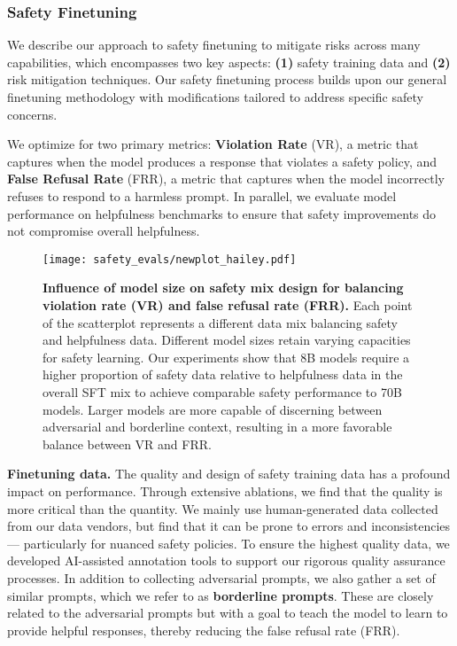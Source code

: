 \subsubsection{Safety Finetuning}

We describe our approach to safety finetuning to mitigate risks across many capabilities, which encompasses two key aspects: \textbf{(1)} safety training data and \textbf{(2)} risk mitigation techniques. Our safety finetuning process builds upon our general finetuning methodology with modifications tailored to address specific safety concerns.

We optimize for two primary metrics: \textbf{Violation Rate} (VR), a metric that captures when the model produces a response that violates a safety policy, and \textbf{False Refusal Rate} (FRR), a metric that captures when the model incorrectly refuses to respond to a harmless prompt.  In parallel, we evaluate model performance on helpfulness benchmarks to ensure that safety improvements do not compromise overall helpfulness.

\begin{wrapfigure}{r}{0.5\textwidth}
    \centering
    \texttt{[image: safety\_evals/newplot\_hailey.pdf]}
    \caption{\textbf{Influence of model size on safety mix design for balancing violation rate (VR) and false refusal rate (FRR).} Each point of the scatterplot represents a different data mix balancing safety and helpfulness data. Different model sizes retain varying capacities for safety learning. Our experiments show that 8B models require a higher proportion of safety data relative to helpfulness data in the overall SFT mix to achieve comparable safety performance to 70B models. Larger models are more capable of discerning between adversarial and borderline context, resulting in a more favorable balance between VR and FRR.}
    \label{fig:vr_frr_model_size_experiment}
\end{wrapfigure}

\textbf{Finetuning data.}
The quality and design of safety training data has a profound impact on performance. Through extensive ablations, we find that the quality is more critical than the quantity. We mainly use human-generated data collected from our data vendors, but find that it can be prone to errors and inconsistencies --- particularly for nuanced safety policies. To ensure the highest quality data, we developed AI-assisted annotation tools to support our rigorous quality assurance processes. In addition to collecting adversarial prompts, we also gather a set of similar prompts, which we refer to as \textbf{borderline prompts}. These are closely related to the adversarial prompts but with a goal to teach the model to learn to provide helpful responses, thereby reducing the false refusal rate (FRR).


